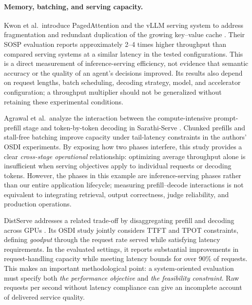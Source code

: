 \paragraph{Memory, batching, and serving capacity.}
Kwon et al.\ introduce PagedAttention and the vLLM serving system to address fragmentation and redundant duplication of the growing key--value cache \cite{kwon2023vllm}. Their SOSP evaluation reports approximately 2--4 times higher throughput than compared serving systems at a similar latency in the tested configurations. This is a direct measurement of inference-serving efficiency, not evidence that semantic accuracy or the quality of an agent's decisions improved. Its results also depend on request lengths, batch scheduling, decoding strategy, model, and accelerator configuration; a throughput multiplier should not be generalized without retaining these experimental conditions.

Agrawal et al.\ analyze the interaction between the compute-intensive prompt-prefill stage and token-by-token decoding in Sarathi-Serve \cite{agrawal2024sarathi}. Chunked prefills and stall-free batching improve capacity under tail-latency constraints in the authors' OSDI experiments. By exposing how two phases interfere, this study provides a clear \emph{cross-stage operational} relationship: optimizing average throughput alone is insufficient when serving objectives apply to individual requests or decoding tokens. However, the phases in this example are inference-serving phases rather than our entire application lifecycle; measuring prefill--decode interactions is not equivalent to integrating retrieval, output correctness, judge reliability, and production operations.

DistServe addresses a related trade-off by disaggregating prefill and decoding across GPUs \cite{zhong2024distserve}. Its OSDI study jointly considers TTFT and TPOT constraints, defining \emph{goodput} through the request rate served while satisfying latency requirements. In the evaluated settings, it reports substantial improvements in request-handling capacity while meeting latency bounds for over 90\% of requests. This makes an important methodological point: a system-oriented evaluation must specify both \emph{the performance objective} and \emph{the feasibility constraint}. Raw requests per second without latency compliance can give an incomplete account of delivered service quality.

